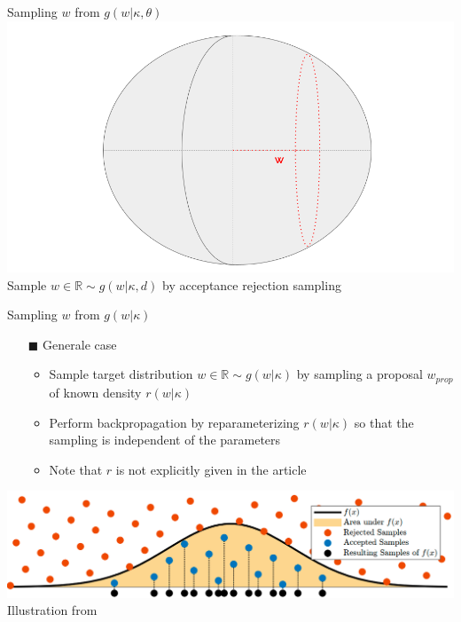 \begin{frame}{Sampling $w$ from $g(w|\kappa, \theta)$}
  \centering
  \includegraphics[width=\textwidth]{figures/illustration_sampling_2.png}  
  Sample $w \in \mathbb{R} \sim g(w |\kappa, d)$ by acceptance rejection sampling
\end{frame}

\begin{frame}{Sampling $w$ from $g(w|\kappa)$}
  \begin{itemize}
    \item[$\blacksquare$] Generale case
    \begin{itemize}
      \item Sample target distribution $w \in \mathbb{R} \sim g(w |\kappa)$ by sampling a proposal $w_{prop}$ of known density $r(w|\kappa)$
      \item Perform backpropagation by reparameterizing $r(w| \kappa)$ so that the sampling is independent of the parameters
      \item Note that $r$ is not explicitly given in the article
    \end{itemize}
  \end{itemize}
  \vfill
  \centering
  \includegraphics[height=.3\textheight]{figures/sampling_meth_illustration.png}
  \tiny{Illustration from \cite{frisch_rejection_2022}}
\end{frame}

